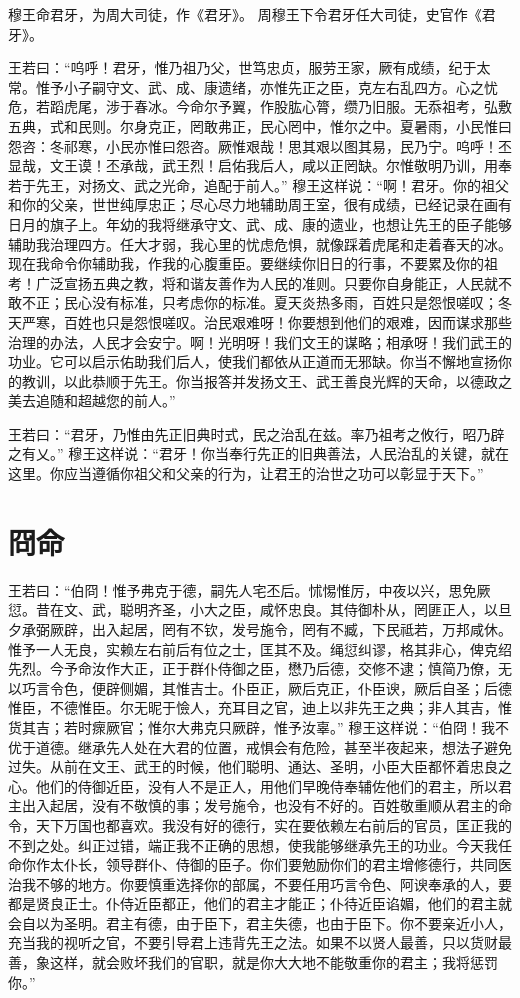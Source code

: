 \documentclass[12pt,UTF8]{ctexbook}
\begin{document}
穆王命君牙，为周大司徒，作《君牙》。
周穆王下令君牙任大司徒，史官作《君牙》。

王若曰：“呜呼！君牙，惟乃祖乃父，世笃忠贞，服劳王家，厥有成绩，纪于太常。惟予小子嗣守文、武、成、康遗绪，亦惟先正之臣，克左右乱四方。心之忧危，若蹈虎尾，涉于春冰。今命尔予翼，作股肱心膂，缵乃旧服。无忝祖考，弘敷五典，式和民则。尔身克正，罔敢弗正，民心罔中，惟尔之中。夏暑雨，小民惟曰怨咨：冬祁寒，小民亦惟曰怨咨。厥惟艰哉！思其艰以图其易，民乃宁。呜呼！丕显哉，文王谟！丕承哉，武王烈！启佑我后人，咸以正罔缺。尔惟敬明乃训，用奉若于先王，对扬文、武之光命，追配于前人。”
穆王这样说：“啊！君牙。你的祖父和你的父亲，世世纯厚忠正；尽心尽力地辅助周王室，很有成绩，已经记录在画有日月的旗子上。年幼的我将继承守文、武、成、康的遗业，也想让先王的臣子能够辅助我治理四方。任大才弱，我心里的忧虑危惧，就像踩着虎尾和走着春天的冰。现在我命令你辅助我，作我的心腹重臣。要继续你旧日的行事，不要累及你的祖考！广泛宣扬五典之教，将和谐友善作为人民的准则。只要你自身能正，人民就不敢不正；民心没有标准，只考虑你的标准。夏天炎热多雨，百姓只是怨恨嗟叹；冬天严寒，百姓也只是怨恨嗟叹。治民艰难呀！你要想到他们的艰难，因而谋求那些治理的办法，人民才会安宁。啊！光明呀！我们文王的谋略；相承呀！我们武王的功业。它可以启示佑助我们后人，使我们都依从正道而无邪缺。你当不懈地宣扬你的教训，以此恭顺于先王。你当报答并发扬文王、武王善良光辉的天命，以德政之美去追随和超越您的前人。”

王若曰：“君牙，乃惟由先正旧典时式，民之治乱在兹。率乃祖考之攸行，昭乃辟之有乂。”
穆王这样说：“君牙！你当奉行先正的旧典善法，人民治乱的关键，就在这里。你应当遵循你祖父和父亲的行为，让君王的治世之功可以彰显于天下。”

\chapter{冏命}

王若曰：“伯冏！惟予弗克于德，嗣先人宅丕后。怵惕惟厉，中夜以兴，思免厥愆。昔在文、武，聪明齐圣，小大之臣，咸怀忠良。其侍御朴从，罔匪正人，以旦夕承弼厥辟，出入起居，罔有不钦，发号施令，罔有不臧，下民祗若，万邦咸休。惟予一人无良，实赖左右前后有位之士，匡其不及。绳愆纠谬，格其非心，俾克绍先烈。今予命汝作大正，正于群仆侍御之臣，懋乃后德，交修不逮；慎简乃僚，无以巧言令色，便辟侧媚，其惟吉士。仆臣正，厥后克正，仆臣谀，厥后自圣；后德惟臣，不德惟臣。尔无昵于憸人，充耳目之官，迪上以非先王之典；非人其吉，惟货其吉；若时瘝厥官；惟尔大弗克只厥辟，惟予汝辜。”
穆王这样说：“伯冏！我不优于道德。继承先人处在大君的位置，戒惧会有危险，甚至半夜起来，想法子避免过失。从前在文王、武王的时候，他们聪明、通达、圣明，小臣大臣都怀着忠良之心。他们的侍御近臣，没有人不是正人，用他们早晚侍奉辅佐他们的君主，所以君主出入起居，没有不敬慎的事；发号施令，也没有不好的。百姓敬重顺从君主的命令，天下万国也都喜欢。我没有好的德行，实在要依赖左右前后的官员，匡正我的不到之处。纠正过错，端正我不正确的思想，使我能够继承先王的功业。今天我任命你作太仆长，领导群仆、侍御的臣子。你们要勉励你们的君主增修德行，共同医治我不够的地方。你要慎重选择你的部属，不要任用巧言令色、阿谀奉承的人，要都是贤良正士。仆侍近臣都正，他们的君主才能正；仆待近臣谄媚，他们的君主就会自以为圣明。君主有德，由于臣下，君主失德，也由于臣下。你不要亲近小人，充当我的视听之官，不要引导君上违背先王之法。如果不以贤人最善，只以货财最善，象这样，就会败坏我们的官职，就是你大大地不能敬重你的君主；我将惩罚你。”
\end{document}
